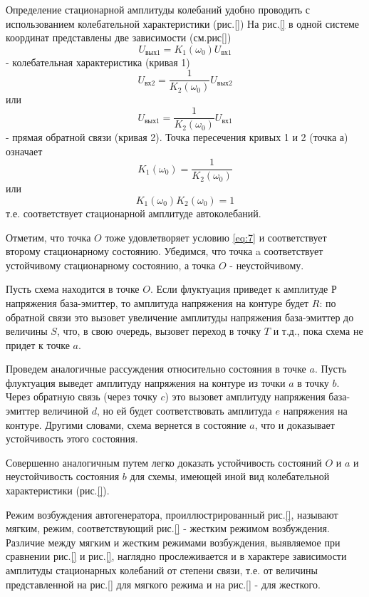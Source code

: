 Определение стационарной амплитуды колебаний удобно проводить с использованием колебательной характеристики (рис.\ref{})
На рис.\ref{} в одной системе координат представлены две зависимости (см.рис\ref{}) 
\begin{equation*}
U_{\text{вых}1}=K_1(\omega_0)U_{\text{вх}1}
\end{equation*}
- колебательная характеристика (кривая 1)
\begin{equation*}
U_{\text{вх}2}=\frac{1}{K_2(\omega_0)}U_{\text{вых}2}
\end{equation*}
или
\begin{equation*}
U_{\text{вых}1}=\frac{1}{K_2(\omega_0)}U_{\text{вх}1}
\end{equation*}
- прямая обратной связи (кривая 2).
Точка пересечения кривых 1 и 2 (точка $а$) означает
\begin{equation*}
K_1(\omega_0)=\frac{1}{K_2(\omega_0)}
\end{equation*}
или
\begin{equation}
K_1(\omega_0)K_2(\omega_0)=1
\label{eq:7}
\end{equation}
т.е. соответствует стационарной амплитуде автоколебаний.

Отметим, что точка $O$ тоже удовлетворяет условию \eqref{eq:7} и соответствует второму стационарному состоянию. Убедимся, что точка a соответствует устойчивому стационарному состоянию, $а$ точка $O$ - неустойчивому.

Пусть схема находится в точке $O$. Если флуктуация приведет к амплитуде $Р$ напряжения база-эмиттер, то амплитуда напряжения на контуре будет $R$: по обратной связи это вызовет увеличение амплитуды напряжения база-эмиттер до величины $S$, что, в свою очередь, вызовет переход в точку $T$ и т.д., пока схема не придет к точке $a$.

Проведем аналогичные рассуждения относительно состояния в точке $a$. Пусть флуктуация выведет амплитуду напряжения на контуре из точки $a$ в точку $b$. Через обратную связь (через точку $c$) это вызовет амплитуду напряжения база-эмиттер величиной $d$, но ей будет соответствовать амплитуда $e$ напряжения на контуре. Другими словами, схема вернется в состояние $a$, что и доказывает устойчивость этого состояния.

Совершенно аналогичным путем легко доказать устойчивость состояний $O$ и $a$ и неустойчивость состояния $b$ для схемы, имеющей иной вид колебательной характеристики (рис.\ref{}).

Режим возбуждения автогенератора, проиллюстрированный рис.\ref{}, называют мягким, режим, соответствующий рис.\ref{} - жестким режимом возбуждения. Различие между мягким и жестким режимами возбуждения, выявляемое при сравнении рис.\ref{} и рис.\ref{}, наглядно прослеживается и в характере зависимости амплитуды стационарных колебаний от степени связи, т.е. от величины представленной на рис.\ref{} для мягкого режима и на рис.\ref{} - для жесткого.

